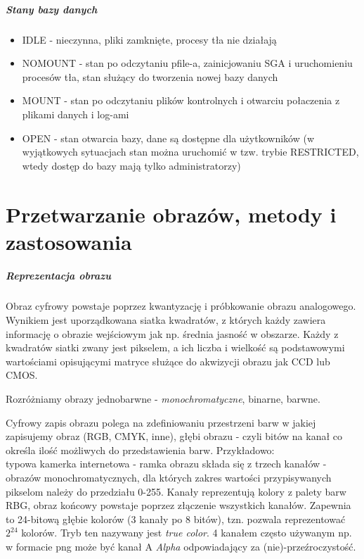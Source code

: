 \documentclass[a4paper,twoside]{report}
\begin{document}
\paragraph{Stany bazy danych}

\begin{itemize}
\item IDLE - nieczynna, pliki zamknięte, procesy tła nie działają 
\item NOMOUNT - stan po odczytaniu pfile-a, zainicjowaniu SGA i uruchomieniu procesów tła, stan służący do tworzenia nowej bazy danych

\item MOUNT - stan po odczytaniu plików kontrolnych i otwarciu połaczenia z plikami danych i log-ami

\item OPEN - stan otwarcia bazy, dane są dostępne dla użytkowników (w wyjątkowych sytuacjach stan można uruchomić w tzw. trybie RESTRICTED, wtedy dostęp do bazy mają tylko administratorzy)

\end{itemize}

\chapter{Przetwarzanie obrazów, metody i zastosowania}
\paragraph{Reprezentacja obrazu}
Obraz cyfrowy powstaje poprzez kwantyzację i próbkowanie obrazu analogowego. Wynikiem jest uporządkowana siatka kwadratów, z których każdy zawiera informację o obrazie wejściowym jak np. średnia jasność w obszarze. Każdy z kwadratów siatki zwany jest pikselem, a ich liczba i wielkość są podstawowymi wartościami opisującymi matryce służące do akwizycji obrazu jak CCD lub CMOS.

Rozróżniamy obrazy jednobarwne - \textit{monochromatyczne}, binarne, barwne.

Cyfrowy zapis obrazu polega na zdefiniowaniu przestrzeni barw w jakiej zapisujemy obraz (RGB, CMYK, inne), głębi obrazu - czyli bitów na kanał co określa ilość możliwych do przedstawienia barw. Przykładowo: \\
typowa kamerka internetowa - ramka obrazu składa się z trzech kanałów - obrazów monochromatycznych, dla których zakres wartości przypisywanych pikselom należy do przedziału 0-255. Kanały reprezentują kolory z palety barw RBG, obraz końcowy powstaje poprzez złączenie wszystkich kanałów. 
Zapewnia to 24-bitową głębie kolorów (3 kanały po 8 bitów), tzn. pozwala reprezentować $2^{24}$  kolorów. Tryb ten nazywany jest \textit{true color}. 
4 kanałem często używanym np. w formacie png może być kanał A \textit{Alpha} odpowiadający za (nie)-przeźroczystość.
\end{document}
